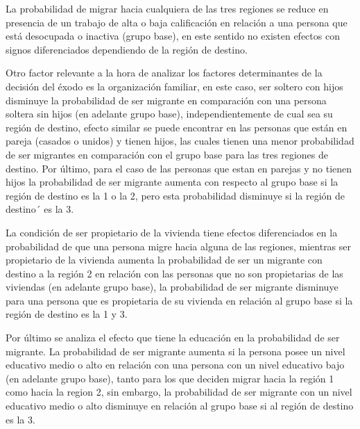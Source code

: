 \documentclass[12pt,a4paper]{article}
\begin{document}
La probabilidad de migrar hacia cualquiera de las tres regiones se reduce en presencia de un trabajo de alta o baja calificación en relación a una persona que está desocupada o inactiva (grupo base), en este sentido no existen efectos con signos diferenciados dependiendo de la región de destino.

Otro factor relevante a la hora de analizar los factores determinantes de la decisión del éxodo es la organización familiar, en este caso, ser soltero con hijos disminuye la probabilidad de ser migrante en comparación con una persona soltera sin hijos (en adelante grupo base), independientemente de cual sea su región de destino, efecto similar se puede encontrar en las personas que están en pareja (casados o unidos) y tienen hijos, las cuales tienen una menor probabilidad de ser migrantes en comparación con el grupo base para las tres regiones de destino. Por último, para el caso de las personas que estan en parejas y no tienen hijos la probabilidad de ser migrante aumenta con respecto al grupo base si la región de destino es la 1 o la 2, pero esta  probabilidad  disminuye si la región de destino´ es la 3.

La condición de ser propietario de la vivienda tiene efectos diferenciados en la probabilidad de que una persona migre hacia alguna de las regiones, mientras ser propietario de la vivienda aumenta la probabilidad de ser un migrante con destino a la región 2 en relación con las personas que no son propietarias de las viviendas (en adelante grupo base), la probabilidad de ser migrante disminuye para una persona que es propietaria de su vivienda en relación al grupo base si la región de destino es la 1 y 3.

Por último se analiza el efecto que tiene la educación en la probabilidad de ser migrante. La probabilidad de ser migrante aumenta si la persona posee un nivel educativo medio o alto en relación con una persona con un nivel educativo bajo (en adelante grupo base), tanto para los que deciden migrar hacia la región 1 como hacia la region 2, sin embargo, la probabilidad de ser migrante con un nivel educativo medio o alto disminuye en relación al grupo base si al región de destino es la 3.
\end{document}
